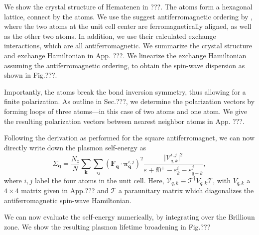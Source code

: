 We show the crystal structure of Hematenen in ???. The  atoms form a hexagonal lattice, connect by the  atoms. We use the suggest antiferromagnetic ordering by \cite{gonzalez}, where the two  atoms at the unit cell center are ferromagnetically aligned, as well as the other two  atoms. In addition, we use their calculated exchange interactions, which are all antiferromagnetic. We summarize the crystal structure and exchange Hamiltonian in App. ???. We linearize the exchange Hamiltonian assuming the antiferromagnetic ordering, to obtain the spin-wave dispersion as shown in Fig.???. 

Importantly, the  atoms break the bond inversion symmetry, thus allowing for a finite polarization. As outline in Sec.???, we determine the polarization vectors by forming loops of three atoms---in this case of two  atoms and one  atom. We give the resulting polarization vectors between nearest neighbor  atoms in App. ???. 

Following the derivation as performed for the square antiferromagnet, we can now directly write down the plasmon self-energy as
\begin{equation}
	\Sigma_{\bm q} = \frac{N_z}{N}\sum_{\bm k}\sum_{ij}(\bm F_{\bm q}\cdot \bm \pi^{i,j}_{\bm q})^2 \frac{\mathcal |\mathcal V_{q,k}^{i,j}|^2}{\varepsilon + \ii 0^+ -\varepsilon_k^i - \varepsilon_{q-k}^j},
\end{equation}
where $i,j$ label the four  atoms in the unit cell. Here, $\mathcal V_{q,k}\equiv \mathcal T^\dagger V_{q,k}\mathcal T$, with $V_{q,k}$ a $4\times4$ matrix given in App.??? and $\mathcal T$ a paraunitary matrix which diagonalizes the antiferromagnetic spin-wave Hamiltonian. 

We can now evaluate the self-energy numerically, by integrating over the Brillioun zone. We show the resulting plasmon lifetime broadening in Fig.???



